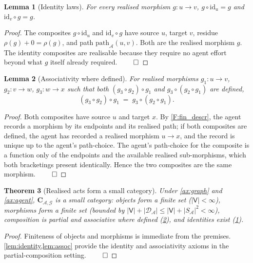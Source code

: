 \documentclass[11pt,a4paper]{article}
\theoremstyle{thmstyle}
\newtheorem{theorem}{Theorem}[section]
\newtheorem{lemma}[theorem]{Lemma}
\theoremstyle{definition}
\theoremstyle{remark}
\newcommand{\Graph}{\mathcal{G}}
\newcommand{\Vrt}{\mathsf{V}}
\newcommand{\Agent}{\mathcal{A}}
\newcommand{\Res}{\rho}
\begin{document}
\begin{lemma}[Identity laws]
\label{lem:identity}
For every realised morphism $g: u \to v$,
$g \circ \mathrm{id}_u = g$ and $\mathrm{id}_v \circ g = g$.
\end{lemma}

\begin{proof}
The composites $g \circ \mathrm{id}_u$ and $\mathrm{id}_v \circ g$
have source $u$, target $v$, residue $\Res(g) + 0 = \Res(g)$, and
path $\mathrm{path}_\Agent(u,v)$. Both are the realised morphism
$g$. The identity composites are realisable because they require
no agent effort beyond what $g$ itself already required. $\qed$
\end{proof}

\begin{lemma}[Associativity where defined]
\label{lem:assoc}
For realised morphisms $g_1: u \to v$, $g_2: v \to w$,
$g_3: w \to x$ such that both $(g_3 \circ g_2) \circ g_1$ and
$g_3 \circ (g_2 \circ g_1)$ are defined,
\[
  (g_3 \circ g_2) \circ g_1 \;=\; g_3 \circ (g_2 \circ g_1).
\]
\end{lemma}

\begin{proof}
Both composites have source $u$ and target $x$. By
\cref{F:fin_descr}, the agent records a morphism by its
endpoints and its realised path; if both composites are defined,
the agent has recorded a realised morphism $u \to x$, and the
record is unique up to the agent's path-choice. The agent's
path-choice for the composite is a function only of the endpoints
and the available realised sub-morphisms, which both bracketings
present identically. Hence the two composites are the same
morphism. $\qed$
\end{proof}

\begin{theorem}[Realised acts form a small category]
\label{thm:category}
Under \cref{ax:graph} and \cref{ax:agent},
$\mathbf{C}_{\Agent,\Graph}$ is a small category: objects form a
finite set ($|\Vrt| < \infty$), morphisms form a finite set
(bounded by $|\Vrt| + |\mathcal{D}_\Agent| \leq |\Vrt| +
|S_\Agent|^2 < \infty$), composition is partial and associative
where defined (\cref{lem:assoc}), and identities exist
(\cref{lem:identity}).
\end{theorem}

\begin{proof}
Finiteness of objects and morphisms is immediate from the premises.
\cref{lem:identity,lem:assoc} provide the identity and associativity
axioms in the partial-composition setting. $\qed$
\end{proof}
\end{document}
